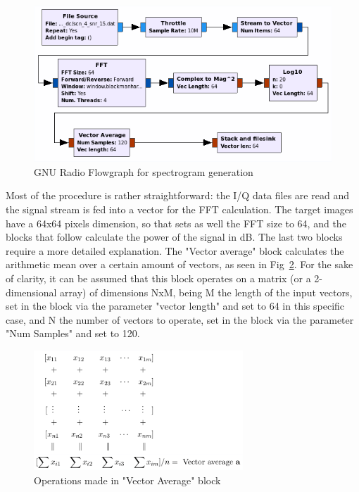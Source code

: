 \begin{figure}[!htb]
    \centering
    \includegraphics[width=\textwidth]{figures/specgram_generation}
    \caption{GNU Radio Flowgraph for spectrogram generation}
    \label{fig:specgram_generation}
\end{figure}

Most of the procedure is rather straightforward: the I/Q data files are read and the signal stream is fed into a vector for the \ac{FFT} calculation. The target images have a 64x64 pixels dimension, so that sets as well the FFT size to 64, and the blocks that follow calculate the power of the signal in dB. The last two blocks require a more detailed explanation.
The "Vector average" block calculates the arithmetic mean over a certain amount of vectors, as seen in Fig~\ref{fig:vectoravg}. For the sake of clarity, it can be assumed that this block operates on a matrix (or a 2-dimensional array) of dimensions NxM, being M the length of the input vectors, set in the block via the parameter "vector length" and set to 64 in this specific case, and N the number of vectors to operate, set in the block via the parameter "Num Samples" and set to 120. \\

\begin{figure}[!htb]
    \centering
    \includegraphics[width=0.7\textwidth]{figures/vectoravg}
    \caption{Operations made in "Vector Average" block}
    \label{fig:vectoravg}
\end{figure}

